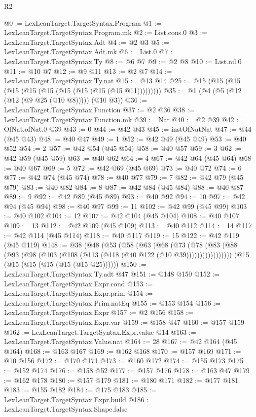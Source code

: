 \begin{lexlean}{R2}
\begin{coremodule}
@0 := LexLeanTarget.TargetSyntax.Program
@1 := LexLeanTarget.TargetSyntax.Program.mk
@2 := List.cons.{0}
@3 := LexLeanTarget.TargetSyntax.Adt
@4 := @2 @3
@5 := LexLeanTarget.TargetSyntax.Adt.mk
@6 := List.{0}
@7 := LexLeanTarget.TargetSyntax.Ty
@8 := @6 @7
@9 := @2 @8
@10 := List.nil.{0}
@11 := @10 @7
@12 := @9 @11
@13 := @2 @7
@14 := LexLeanTarget.TargetSyntax.Ty.nat
@15 := @13 @14
@25 := @15 (@15 (@15 (@15 (@15 (@15 (@15 (@15 (@15 (@15 @11)))))))))
@35 := @1 (@4 (@5 (@12 (@12 (@9 @25 (@10 @8))))) (@10 @3))
@36 := LexLeanTarget.TargetSyntax.Function
@37 := @2 @36
@38 := LexLeanTarget.TargetSyntax.Function.mk
@39 := Nat
@40 := @2 @39
@42 := OfNat.ofNat.{0} @39
@43 := 0
@44 := @42 @43
@45 := instOfNatNat
@47 := @44 (@45 @43)
@48 := @40 @47
@49 := 1
@52 := @42 @49 (@45 @49)
@53 := @40 @52
@54 := 2
@57 := @42 @54 (@45 @54)
@58 := @40 @57
@59 := 3
@62 := @42 @59 (@45 @59)
@63 := @40 @62
@64 := 4
@67 := @42 @64 (@45 @64)
@68 := @40 @67
@69 := 5
@72 := @42 @69 (@45 @69)
@73 := @40 @72
@74 := 6
@77 := @42 @74 (@45 @74)
@78 := @40 @77
@79 := 7
@82 := @42 @79 (@45 @79)
@83 := @40 @82
@84 := 8
@87 := @42 @84 (@45 @84)
@88 := @40 @87
@89 := 9
@92 := @42 @89 (@45 @89)
@93 := @40 @92
@94 := 10
@97 := @42 @94 (@45 @94)
@98 := @40 @97
@99 := 11
@102 := @42 @99 (@45 @99)
@103 := @40 @102
@104 := 12
@107 := @42 @104 (@45 @104)
@108 := @40 @107
@109 := 13
@112 := @42 @109 (@45 @109)
@113 := @40 @112
@114 := 14
@117 := @42 @114 (@45 @114)
@118 := @40 @117
@119 := 15
@122 := @42 @119 (@45 @119)
@148 := @38
    (@48
      (@53
        (@58
          (@63
            (@68
              (@73
                (@78 (@83 (@88 (@93 (@98 (@103 (@108 (@113 (@118 (@40 @122 (@10 @39)))))))))))))))))
    (@15 (@15 (@15 (@15 (@15 (@15 @25))))))
@150 := LexLeanTarget.TargetSyntax.Ty.adt @47
@151 := @148 @150
@152 := LexLeanTarget.TargetSyntax.Expr.cond
@153 := LexLeanTarget.TargetSyntax.Expr.prim
@154 := LexLeanTarget.TargetSyntax.Prim.natEq
@155 := @153 @154
@156 := LexLeanTarget.TargetSyntax.Expr
@157 := @2 @156
@158 := LexLeanTarget.TargetSyntax.Expr.var
@159 := @158 @47
@160 := @157 @159
@162 := LexLeanTarget.TargetSyntax.Expr.value @14
@163 := LexLeanTarget.TargetSyntax.Value.nat
@164 := 28
@167 := @42 @164 (@45 @164)
@168 := @163 @167
@169 := @162 @168
@170 := @157 @169
@171 := @10 @156
@172 := @170 @171
@173 := @160 @172
@174 := @155 @173
@175 := @152 @174
@176 := @158 @52
@177 := @157 @176
@178 := @163 @47
@179 := @162 @178
@180 := @157 @179
@181 := @180 @171
@182 := @177 @181
@183 := @155 @182
@184 := @175 @183
@185 := LexLeanTarget.TargetSyntax.Expr.build
@186 := LexLeanTarget.TargetSyntax.Shape.false

\end{coremodule}
\end{lexlean}
